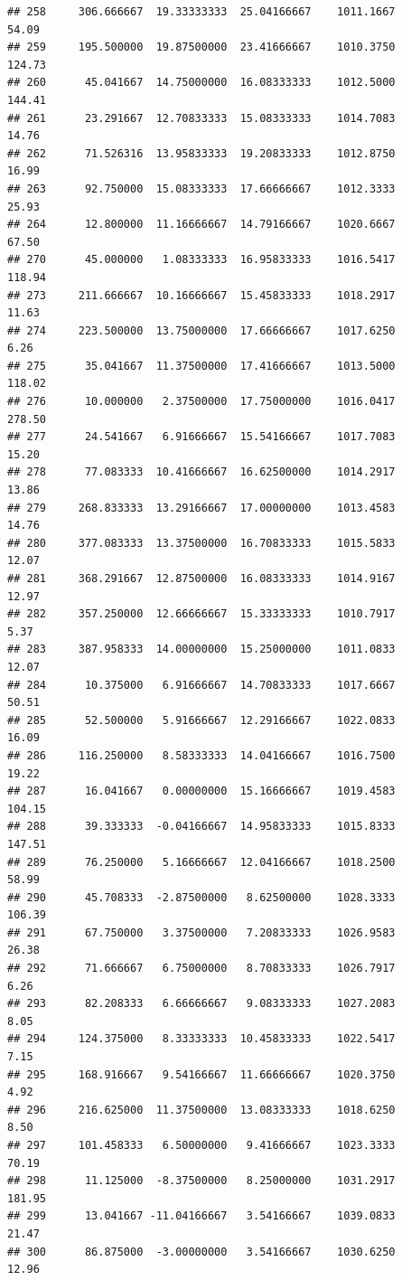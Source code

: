 \documentclass[
]{article}
\begin{document}
\begin{verbatim}
## 258     306.666667  19.33333333  25.04166667    1011.1667       54.09
## 259     195.500000  19.87500000  23.41666667    1010.3750      124.73
## 260      45.041667  14.75000000  16.08333333    1012.5000      144.41
## 261      23.291667  12.70833333  15.08333333    1014.7083       14.76
## 262      71.526316  13.95833333  19.20833333    1012.8750       16.99
## 263      92.750000  15.08333333  17.66666667    1012.3333       25.93
## 264      12.800000  11.16666667  14.79166667    1020.6667       67.50
## 270      45.000000   1.08333333  16.95833333    1016.5417      118.94
## 273     211.666667  10.16666667  15.45833333    1018.2917       11.63
## 274     223.500000  13.75000000  17.66666667    1017.6250        6.26
## 275      35.041667  11.37500000  17.41666667    1013.5000      118.02
## 276      10.000000   2.37500000  17.75000000    1016.0417      278.50
## 277      24.541667   6.91666667  15.54166667    1017.7083       15.20
## 278      77.083333  10.41666667  16.62500000    1014.2917       13.86
## 279     268.833333  13.29166667  17.00000000    1013.4583       14.76
## 280     377.083333  13.37500000  16.70833333    1015.5833       12.07
## 281     368.291667  12.87500000  16.08333333    1014.9167       12.97
## 282     357.250000  12.66666667  15.33333333    1010.7917        5.37
## 283     387.958333  14.00000000  15.25000000    1011.0833       12.07
## 284      10.375000   6.91666667  14.70833333    1017.6667       50.51
## 285      52.500000   5.91666667  12.29166667    1022.0833       16.09
## 286     116.250000   8.58333333  14.04166667    1016.7500       19.22
## 287      16.041667   0.00000000  15.16666667    1019.4583      104.15
## 288      39.333333  -0.04166667  14.95833333    1015.8333      147.51
## 289      76.250000   5.16666667  12.04166667    1018.2500       58.99
## 290      45.708333  -2.87500000   8.62500000    1028.3333      106.39
## 291      67.750000   3.37500000   7.20833333    1026.9583       26.38
## 292      71.666667   6.75000000   8.70833333    1026.7917        6.26
## 293      82.208333   6.66666667   9.08333333    1027.2083        8.05
## 294     124.375000   8.33333333  10.45833333    1022.5417        7.15
## 295     168.916667   9.54166667  11.66666667    1020.3750        4.92
## 296     216.625000  11.37500000  13.08333333    1018.6250        8.50
## 297     101.458333   6.50000000   9.41666667    1023.3333       70.19
## 298      11.125000  -8.37500000   8.25000000    1031.2917      181.95
## 299      13.041667 -11.04166667   3.54166667    1039.0833       21.47
## 300      86.875000  -3.00000000   3.54166667    1030.6250       12.96

\end{verbatim}
\end{document}
